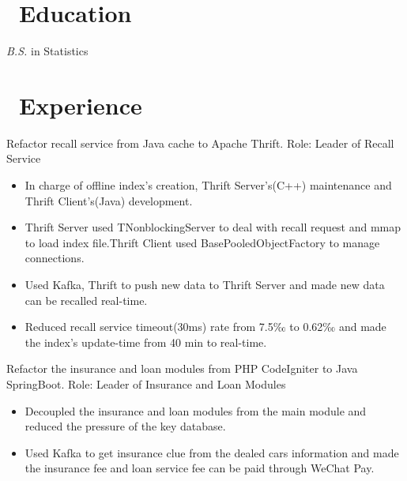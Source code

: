\documentclass{resume}
\begin{document}



\section{\faGraduationCap\ Education}
\textit{B.S.} in Statistics

\section{\faUsers\ Experience}
Refactor recall service from Java cache to Apache Thrift.
\newline Role: Leader of Recall Service
\begin{itemize}
  \item In charge of offline index's creation, Thrift Server's(C++) maintenance and Thrift Client's(Java) development.
  \item Thrift Server used TNonblockingServer to deal with recall request and mmap to load index file.Thrift Client used BasePooledObjectFactory to manage connections.
  \item Used Kafka, Thrift to push new data to Thrift Server and made new data can be recalled real-time.
  \item Reduced recall service timeout(30ms) rate from 7.5‰ to 0.62‰ and made the index's update-time from 40 min to real-time.
\end{itemize}

Refactor the insurance and loan modules from PHP CodeIgniter to Java SpringBoot.
\newline Role: Leader of Insurance and Loan Modules
\begin{itemize}
  \item Decoupled the insurance and loan modules from the main module and reduced the pressure of the key database.
  \item Used Kafka to get insurance clue from the dealed cars information and made the insurance fee and loan service fee can be paid through WeChat Pay.
\end{itemize}
\end{document}
